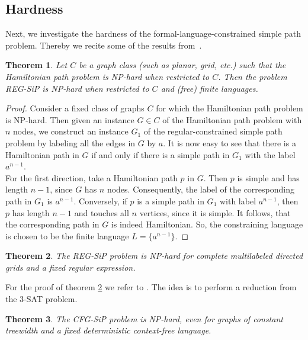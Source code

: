 \documentclass[]{article}
\newtheorem{theorem}{Theorem}[section]
\numberwithin{equation}{section}
\begin{document}
\subsection{Hardness}
\label{sec:sip:hard}

Next, we investigate the hardness of the formal-language-constrained simple path problem. Thereby we recite some of the results from~\cite{BJM00}.

\begin{theorem}
	\label{thm:finitesiphard}
	Let $C$ be a graph class (such as planar, grid, etc.) such that the Hamiltonian path problem is NP-hard when restricted to $C$. Then the problem REG-SiP is NP-hard when restricted to $C$ and (free) finite languages.
\end{theorem}

\begin{proof}
	Consider a fixed class of graphs $C$ for which the Hamiltonian path problem is NP-hard. Then given an instance $G\in C$ of the Hamiltonian path problem with $n$ nodes, we construct an instance $G_1$ of the regular-constrained simple path problem by labeling all the edges in $G$ by $a$. It is now easy to see that there is a Hamiltonian path in $G$ if and only if there is a simple path in $G_1$ with the label $a^{n-1}$.\\
	
	For the first direction, take a Hamiltonian path $p$ in $G$. Then $p$ is simple and has length $n-1$, since $G$ has $n$ nodes. Consequently, the label of the corresponding path in $G_1$ is $a^{n-1}$. Conversely, if $p$ is a simple path in $G_1$ with label $a^{n-1}$, then $p$ has length $n-1$ and touches all $n$ vertices, since it is simple. It follows, that the corresponding path in $G$ is indeed Hamiltonian. So, the constraining language is chosen to be the finite language $L=\{a^{n-1}\}$.
\end{proof}

\begin{theorem}
	\label{thm:regsiphard}
	The REG-SiP problem is NP-hard for complete multilabeled directed grids and a fixed regular expression.
\end{theorem}

For the proof of theorem \ref{thm:regsiphard} we refer to \cite{BJM00}. The idea is to perform a reduction from the 3-SAT problem.

\begin{theorem}
	\label{thm:cfgsiphard}
	The CFG-SiP problem is NP-hard, even for graphs of constant
	treewidth and a fixed deterministic context-free language.
\end{theorem}
\end{document}
